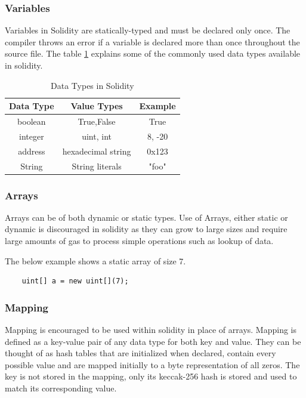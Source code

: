 \documentclass[11pt,openright]{report}
\begin{document}
\subsubsection{Variables}
Variables in Solidity are statically-typed and must be declared only once. The compiler throws an error if a variable is declared more than once throughout the source file. The table \ref{solidity_data_types} explains some of the commonly used data types available in solidity.
 
\begin{table}[!htbp]
    \renewcommand{\arraystretch}{1.3}
    \caption{Data Types in Solidity}
    \label{solidity_data_types}
    \centering
    \begin{tabular}{|c|c|c|}
        \hline
        \bfseries Data Type & \bfseries Value Types & \bfseries Example \\
        \hline\hline
        boolean & True,False & True \\ \hline
        integer & uint, int & 8, -20 \\ \hline
        address & hexadecimal string & 0x123 \\ \hline
        String & String literals & "foo" \\ \hline
    \end{tabular}
\end{table}

\newpage
\subsubsection{Arrays}
Arrays can be of both dynamic or static types. Use of Arrays, either static or dynamic is discouraged in solidity as they can grow to large sizes and require large amounts of gas to process simple operations such as lookup of data.

The below example shows a static array of size 7.
\begin{verbatim}
    uint[] a = new uint[](7);
\end{verbatim}

\subsubsection{Mapping}
Mapping is encouraged to be used within solidity in place of arrays. Mapping is defined as a key-value pair of any data type for both key and value. They can be thought of as hash tables that are initialized when declared, contain every possible value and are mapped initially to a byte representation of all zeros. The key is not stored in the mapping, only its keccak-256 hash is stored and used to match its corresponding value.
\end{document}
